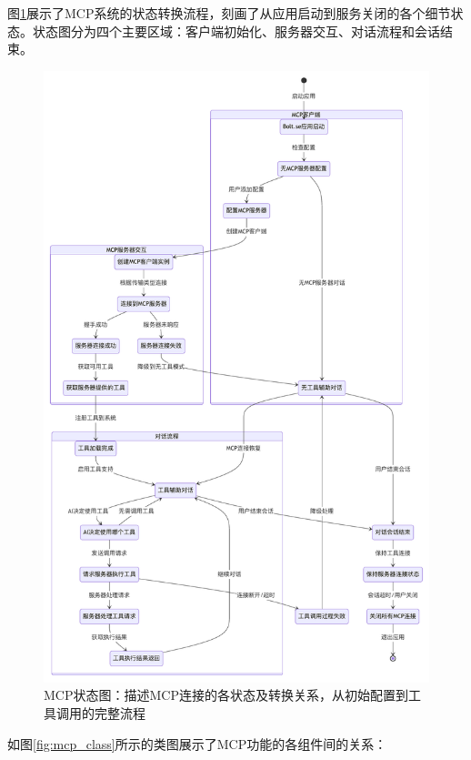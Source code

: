 图\ref{fig:mcp_state}展示了MCP系统的状态转换流程，刻画了从应用启动到服务关闭的各个细节状态。状态图分为四个主要区域：客户端初始化、服务器交互、对话流程和会话结束。

\begin{figure}[H]
  \centering
  \includegraphics[width=\textwidth]{figures/mcp_state.pdf}
  \caption{MCP状态图：描述MCP连接的各状态及转换关系，从初始配置到工具调用的完整流程}
  \label{fig:mcp_state}
\end{figure}

如图\ref{fig:mcp_class}所示的类图展示了MCP功能的各组件间的关系：

